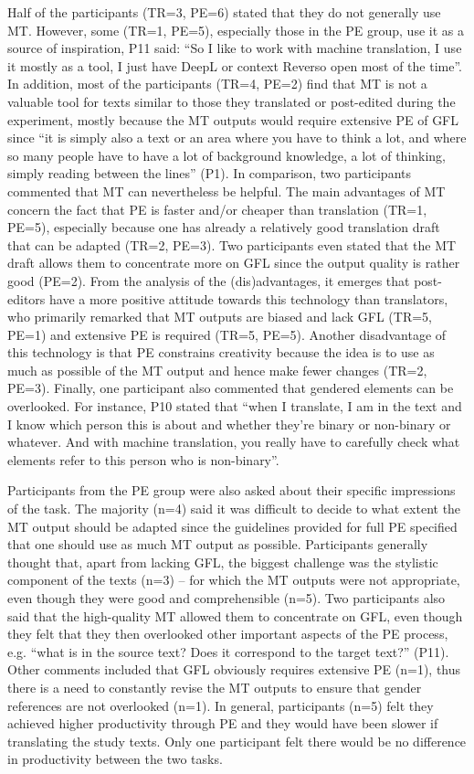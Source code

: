 Half of the participants (TR=3, PE=6) stated that they do not generally use MT. However, some (TR=1, PE=5), especially those in the PE group, use it as a source of inspiration, P11 said: ``So I like to work with machine translation, I use it mostly as a tool, I just have DeepL or context Reverso open most of the time''. In addition, most of the participants (TR=4, PE=2) find that MT is not a valuable tool for texts similar to those they translated or post-edited during the experiment, mostly because the MT outputs would require extensive PE of GFL since ``it is simply also a text or an area where you have to think a lot, and where so many people have to have a lot of background knowledge, a lot of thinking, simply reading between the lines'' (P1).
In comparison, two participants commented that MT can nevertheless be helpful.
The main advantages of MT concern the fact that PE is faster and/or cheaper than translation (TR=1, PE=5), especially because one has already a relatively good translation draft that can be adapted (TR=2, PE=3). Two participants even stated that the MT draft allows them to concentrate more on GFL since the output quality is rather good (PE=2). From the analysis of the (dis)advantages, it emerges that post-editors have a more positive attitude towards this technology than translators, who primarily remarked that MT outputs are biased and lack GFL (TR=5, PE=1) and extensive PE is required (TR=5, PE=5). Another disadvantage of this technology is that PE constrains creativity because the idea is to use as much as possible of the MT output and hence make fewer changes (TR=2, PE=3). Finally, one participant also commented that gendered elements can be overlooked. For instance, P10 stated that ``when I translate, I am in the text and I know which person this is about and whether they're binary or non-binary or whatever. And with machine translation, you really have to carefully check what elements refer to this person who is non-binary''.

Participants from the PE group were also asked about their specific impressions of the task. The majority (n=4) said it was difficult to decide to what extent the MT output should be adapted since the guidelines provided for full PE specified that one should use as much MT output as possible. Participants generally thought that, apart from lacking GFL, the biggest challenge was the stylistic component of the texts (n=3) -- for which the MT outputs were not appropriate, even though they were good and comprehensible (n=5). Two participants also said that the high-quality MT allowed them to concentrate on GFL, even though they felt that they then overlooked other important aspects of the PE process, e.g. ``what is in the source text? Does it correspond to the target text?'' (P11). 
Other comments included that GFL obviously requires extensive PE (n=1), thus there is a need to constantly revise the MT outputs to ensure that gender references are not overlooked (n=1). In general, participants (n=5) felt they achieved higher productivity through PE and they would have been slower if translating the study texts. Only one participant felt there would be no difference in productivity between the two tasks.

